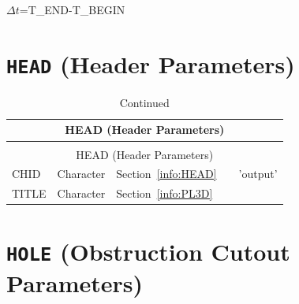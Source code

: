 \documentclass[11pt]{book}
\begin{document}
\noindent
$\Delta t$={\ct T\_END-T\_BEGIN}

\vspace{\baselineskip}

\section{\texorpdfstring{{\tt HEAD}}{HEAD} (Header Parameters)}


\begin{longtable}{@{\extracolsep{\fill}}|l|l|l|l|l|}
\caption[Header parameters ({\ct HEAD} namelist group)]{For more information see Section~\ref{info:HEAD}.}
\label{tbl:HEAD} \\
\hline
\multicolumn{5}{|c|}{{\ct HEAD} (Header Parameters)} \\
\hline \hline
\endfirsthead
\caption[]{Continued} \\
\hline
\multicolumn{5}{|c|}{{\ct HEAD} (Header Parameters)} \\
\hline \hline
\endhead
{\ct CHID}      & Character   & Section~\ref{info:HEAD}     &           & {\ct 'output'}    \\ \hline
{\ct TITLE}     & Character   & Section~\ref{info:PL3D}     &           &                   \\ \hline
\end{longtable}

\vspace{\baselineskip}



\section{\texorpdfstring{{\tt HOLE}}{HOLE} (Obstruction Cutout Parameters)}
\end{document}
